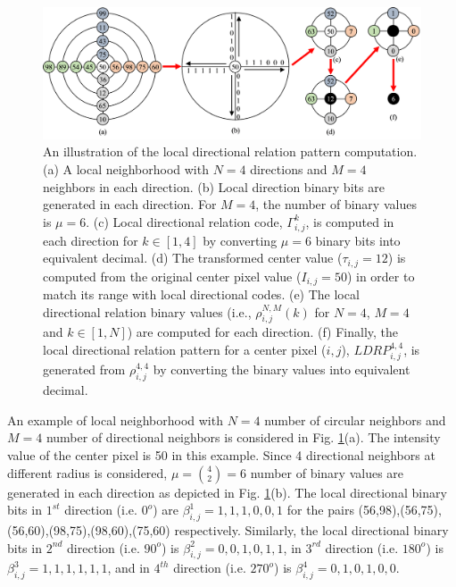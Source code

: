 \documentclass[a4paper]{article}
\begin{document}
\begin{figure}[!t]
    \centering
    \includegraphics[width=.99\linewidth]{2.png}
    \caption{An illustration of the local directional relation pattern computation. (a) A local neighborhood with $N=4$ directions and $M=4$ neighbors in each direction. (b) Local direction binary bits are generated in each direction. For $M=4$, the number of binary values is $\mu=6$. (c) Local directional relation code, $\Gamma_{i,j}^{k}$, is computed in each direction for $k \in [1, 4]$ by converting $\mu=6$ binary bits into equivalent decimal. (d) The transformed center value ($\tau_{i,j}=12$) is computed from the original center pixel value ($I_{i,j}=50$) in order to match its range with local directional codes. (e) The local directional relation binary values (i.e., $\rho_{i,j}^{N,M}(k)$ for $N=4$, $M=4$ and $k \in [1,N]$) are computed for each direction. (f) Finally, the local directional relation pattern for a center pixel ($i,j$), $LDRP_{i,j}^{4,4}$, is generated from $\rho_{i,j}^{4,4}$ by converting the binary values into equivalent decimal.}
    \label{fig:example}
\end{figure}

An example of local neighborhood with $N=4$ number of circular neighbors and $M=4$ number of directional neighbors is considered in Fig. \ref{fig:example}(a). The intensity value of the center pixel is 50 in this example. Since 4 directional neighbors at different radius is considered, $\mu=\binom{4}{2}=6$ number of binary values are generated in each direction as depicted in Fig. \ref{fig:example}(b). The local directional binary bits in $1^{st}$ direction (i.e. $0^o$) are $\beta_{i,j}^{1} = 1,1,1,0,0,1$ for the pairs (56,98),(56,75),(56,60),(98,75),(98,60),(75,60) respectively. Similarly, the local directional binary bits in $2^{nd}$ direction (i.e. $90^o$) is $\beta_{i,j}^{2} = 0,0,1,0,1,1$, in $3^{rd}$ direction (i.e. $180^o$) is $\beta_{i,j}^{3} = 1,1,1,1,1,1$, and in $4^{th}$ direction (i.e. $270^o$) is $\beta_{i,j}^{4} = 0,1,0,1,0,0$. 
\end{document}

